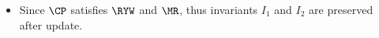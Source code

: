 \begin{itemize}

\item Since \( \CP \) satisfies \( \RYW \) and \( \MR \), thus invariants \( I_1 \) and  \( I_2 \) are preserved after update.

\end{itemize}
    

